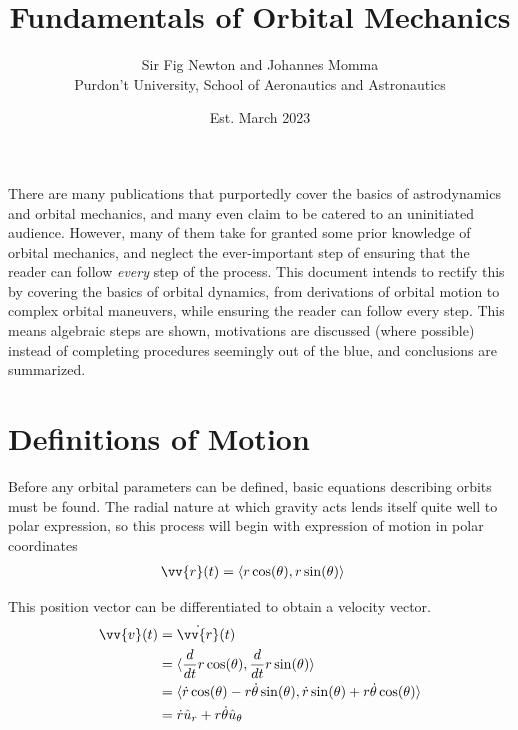 \documentclass{article}
\title{Fundamentals of Orbital Mechanics}
\author{Sir Fig Newton and Johannes Momma\\Purdon't University, School of Aeronautics and Astronautics}
\date{Est. March 2023}
\begin{document}
\maketitle

There are many publications that purportedly cover the basics of astrodynamics and orbital mechanics, and many even claim to be catered to an uninitiated audience. However, many of them take for granted some prior knowledge of orbital mechanics, and neglect the ever-important step of ensuring that the reader can follow \textit{every} step of the process. This document intends to rectify this by covering the basics of orbital dynamics, from derivations of orbital motion to complex orbital maneuvers, while ensuring the reader can follow every step. This means algebraic steps are shown, motivations are discussed (where possible) instead of completing procedures seemingly out of the blue, and conclusions are summarized.

\pagebreak
\tableofcontents

\pagebreak
\section{Definitions of Motion}

Before any orbital parameters can be defined, basic equations describing orbits must be found. The radial nature at which gravity acts lends itself quite well to polar expression, so this process will begin with expression of motion in polar coordinates
\begin{align*}
    \vv{r}(t) & =\langle{}r\cos(\theta), r\sin(\theta)\rangle{}
\end{align*}

This position vector can be differentiated to obtain a velocity vector.
\begin{align*}
    \vv{v}(t) & =\dot{\vv{r}}(t)                                                                                                \\
              & =\langle{}\frac{d}{dt}r\cos(\theta), \frac{d}{dt}r\sin(\theta)\rangle{}                                         \\
              & =\langle{}\dot{r}\cos(\theta)-r\dot{\theta}\sin(\theta), \dot{r}\sin(\theta)+r\dot{\theta}\cos(\theta)\rangle{} \\
              & =\dot{r}\hat{u}_r+r\dot{\theta}\hat{u}_\theta
\end{align*}
\end{document}
